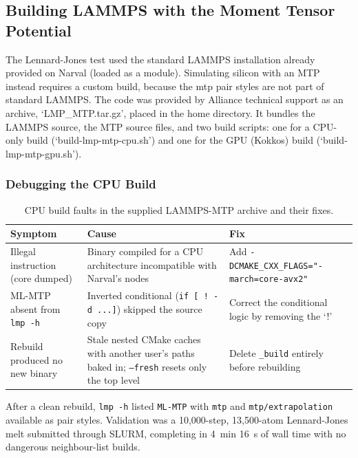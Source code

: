\documentclass{article}
\begin{document}
\subsection{Building LAMMPS with the Moment Tensor Potential}

The Lennard-Jones test used the standard LAMMPS installation already provided on Narval (loaded as a module). Simulating silicon with an MTP instead requires a custom build, because the mtp pair styles are not part of standard LAMMPS. The code was provided by Alliance technical support as an archive, `LMP\_MTP.tar.gz', placed in the home directory. It bundles the LAMMPS source, the MTP source files, and two build scripts: one for a CPU-only build (`build-lmp-mtp-cpu.sh') and one for the GPU (Kokkos) build (`build-lmp-mtp-gpu.sh').

\subsubsection{Debugging the CPU Build}

\begin{table}[H]
\centering
\small
\begin{tabular}{p{}|p{}|p{}}
\toprule
Symptom & Cause & Fix \\
\midrule
Illegal instruction (core dumped) & Binary compiled for a CPU architecture incompatible with Narval's nodes & Add \texttt{-DCMAKE\_CXX\_FLAGS="-march=core-avx2"} \\
\hline
ML-MTP absent from \texttt{lmp -h} & Inverted conditional (\texttt{if [ ! -d ...]}) skipped the source copy & Correct the conditional logic by removing the `!' \\
\hline
Rebuild produced no new binary & Stale nested CMake caches with another user's paths baked in; \texttt{--fresh} resets only the top level & Delete \texttt{\_build} entirely before rebuilding \\
\bottomrule
\end{tabular}
\caption{CPU build faults in the supplied LAMMPS-MTP archive and their fixes.}
\label{tab:buildfaults-cpu}
\end{table}

After a clean rebuild, \texttt{lmp -h} listed \texttt{ML-MTP} with \texttt{mtp} and \texttt{mtp/extrapolation} available as pair styles. Validation was a 10{,}000-step, 13{,}500-atom Lennard-Jones melt submitted through SLURM, completing in 4~min 16~s of wall time with no dangerous neighbour-list builds.
\end{document}
